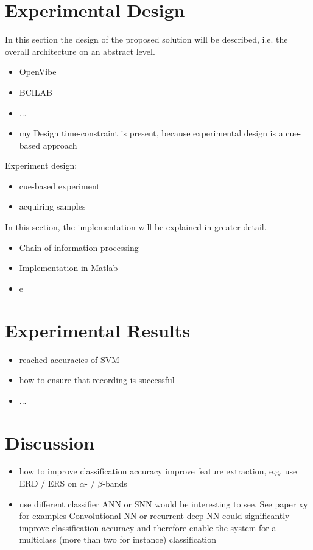 \documentclass[a4paper,twoside, openright,12pt]{report}
\begin{document}
\section{Experimental Design}
In this section the design of the proposed solution will be described, i.e. the overall architecture on an abstract level. 

\begin{itemize}
	\item OpenVibe
	\item BCILAB
	\item ... 
	\item my Design
	\subitem time-constraint is present, because experimental design is a cue-based approach
\end{itemize}

Experiment design:
\begin{itemize}
	\item cue-based experiment
	\item acquiring samples 
\end{itemize}

In this section, the implementation will be explained in greater detail. 
\begin{itemize}
	\item Chain of information processing
	\item Implementation in Matlab
	\item e
\end{itemize}


\section{Experimental Results}

\begin{itemize}
	\item reached accuracies of SVM
	\item how to ensure that recording is successful  
	\item ...
\end{itemize}


\section{Discussion}
\begin{itemize}
	\item how to improve classification accuracy
	\subitem improve feature extraction, e.g. use ERD / ERS on $\alpha$- / $\beta$-bands 
	\item use different classifier 
	\subitem ANN or SNN would be interesting to see. See paper xy for examples
	\subitem Convolutional NN or recurrent deep NN could significantly improve classification accuracy and therefore enable the system for a multiclass (more than two for instance) classification 
\end{itemize}
\end{document}
